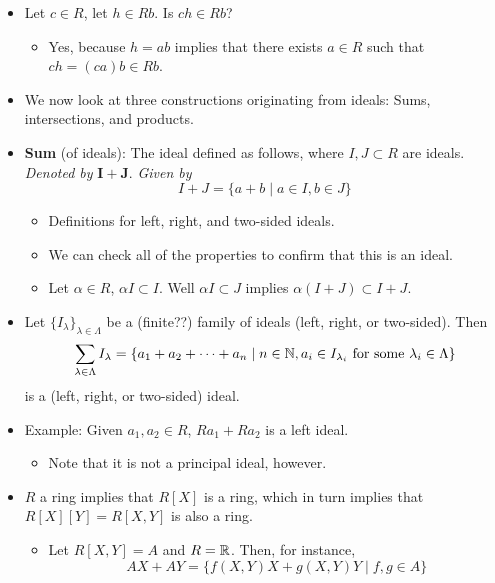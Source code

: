 \documentclass[../notes.tex]{subfiles}
\begin{document}
\begin{itemize}
\begin{itemize}
    \end{itemize}
    \item Let $c\in R$, let $h\in Rb$. Is $ch\in Rb$?
    \begin{itemize}
        \item Yes, because $h=ab$ implies that there exists $a\in R$ such that $ch=(ca)b\in Rb$.
    \end{itemize}
    \item We now look at three constructions originating from ideals: Sums, intersections, and products.
    \item \textbf{Sum} (of ideals): The ideal defined as follows, where $I,J\subset R$ are ideals. \emph{Denoted by} $\bm{I+J}$. \emph{Given by}
    \begin{equation*}
        I+J = \{a+b\mid a\in I,b\in J\}
    \end{equation*}
    \begin{itemize}
        \item Definitions for left, right, and two-sided ideals.
        \item We can check all of the properties to confirm that this is an ideal.
        \item Let $\alpha\in R$, $\alpha I\subset I$.  Well $\alpha I\subset J$ implies $\alpha(I+J)\subset I+J$.
    \end{itemize}
    \item Let $\{I_\lambda\}_{\lambda\in\Lambda}$ be a (finite??) family of ideals (left, right, or two-sided). Then
    \begin{equation*}
        \sum_{\lambda\in\Lambda}I_\lambda = \{a_1+a_2+\cdots+a_n\mid n\in\mathbb{N},a_i\in I_{\lambda_i}\text{ for some }\lambda_i\in\Lambda\}
    \end{equation*}
    is a (left, right, or two-sided) ideal.
    \item Example: Given $a_1,a_2\in R$, $Ra_1+Ra_2$ is a left ideal.
    \begin{itemize}
        \item Note that it is not a principal ideal, however.
    \end{itemize}
    \item $R$ a ring implies that $R[X]$ is a ring, which in turn implies that $R[X][Y]=R[X,Y]$ is also a ring.
    \begin{itemize}
        \item Let $R[X,Y]=A$ and $R=\mathbb{R}$. Then, for instance,
        \begin{equation*}
            AX+AY = \{f(X,Y)X+g(X,Y)Y\mid f,g\in A\}

\end{equation*}
\end{itemize}
\end{itemize}
\end{document}
